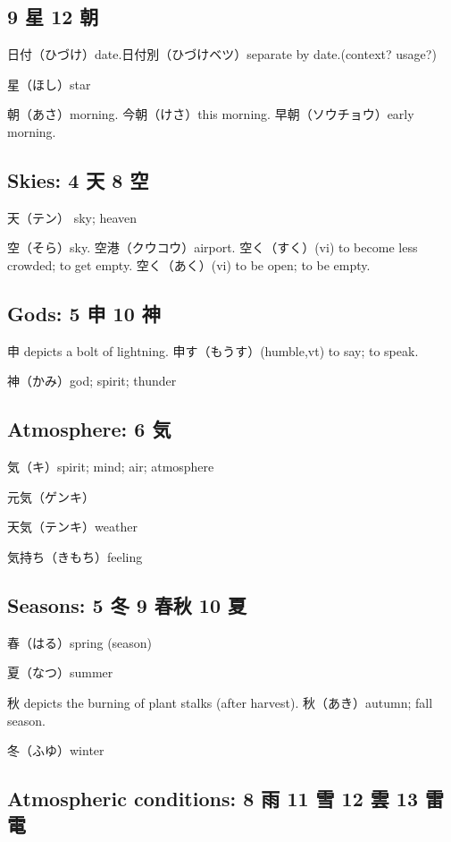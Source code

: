 \subsection{9 星 12 朝}

日付（ひづけ）date.日付別（ひづけベツ）separate by date.(context? usage?)

星（ほし）star

朝（あさ）morning.
今朝（けさ）this morning.
早朝（ソウチョウ）early morning.

\subsection{Skies: 4 天 8 空}

天（テン） sky; heaven

空（そら）sky.
空港（クウコウ）airport.
空く（すく）(vi) to become less crowded; to get empty.
空く（あく）(vi) to be open; to be empty.

\subsection{Gods: 5 申 10 神}

申 depicts a bolt of lightning.
申す（もうす）(humble,vt) to say; to speak.

神（かみ）god; spirit; thunder

\subsection{Atmosphere: 6 気}

気（キ）spirit; mind; air; atmosphere

元気（ゲンキ）

天気（テンキ）weather

気持ち（きもち）feeling

\subsection{Seasons: 5 冬 9 春秋 10 夏}

春（はる）spring (season)

夏（なつ）summer

秋 depicts the burning of plant stalks (after harvest).
秋（あき）autumn; fall season.

冬（ふゆ）winter

\subsection{Atmospheric conditions: 8 雨 11 雪 12 雲 13 雷電}

